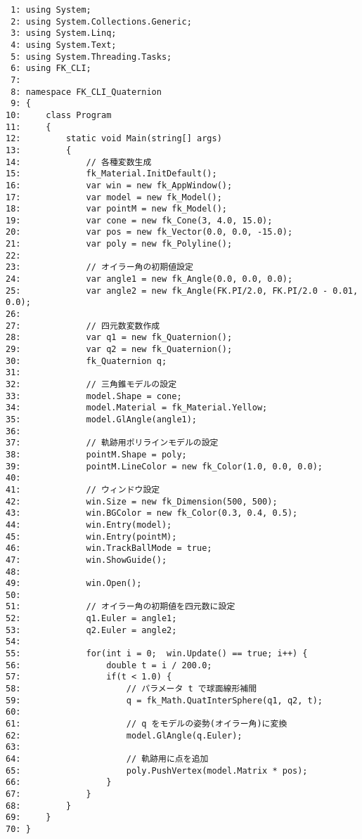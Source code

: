 \begin{breakbox}
\begin{small}
\begin{verbatim}
 1: using System;
 2: using System.Collections.Generic;
 3: using System.Linq;
 4: using System.Text;
 5: using System.Threading.Tasks;
 6: using FK_CLI;
 7: 
 8: namespace FK_CLI_Quaternion
 9: {
10:     class Program
11:     {
12:         static void Main(string[] args)
13:         {
14:             // 各種変数生成
15:             fk_Material.InitDefault();
16:             var win = new fk_AppWindow();
17:             var model = new fk_Model();
18:             var pointM = new fk_Model();
19:             var cone = new fk_Cone(3, 4.0, 15.0);
20:             var pos = new fk_Vector(0.0, 0.0, -15.0);
21:             var poly = new fk_Polyline();
22: 
23:             // オイラー角の初期値設定
24:             var angle1 = new fk_Angle(0.0, 0.0, 0.0);
25:             var angle2 = new fk_Angle(FK.PI/2.0, FK.PI/2.0 - 0.01, 0.0);
26: 
27:             // 四元数変数作成
28:             var q1 = new fk_Quaternion();
29:             var q2 = new fk_Quaternion();
30:             fk_Quaternion q;
31: 
32:             // 三角錐モデルの設定
33:             model.Shape = cone;
34:             model.Material = fk_Material.Yellow;
35:             model.GlAngle(angle1);
36: 
37:             // 軌跡用ポリラインモデルの設定
38:             pointM.Shape = poly;
39:             pointM.LineColor = new fk_Color(1.0, 0.0, 0.0);
40: 
41:             // ウィンドウ設定
42:             win.Size = new fk_Dimension(500, 500);
43:             win.BGColor = new fk_Color(0.3, 0.4, 0.5);
44:             win.Entry(model);
45:             win.Entry(pointM);
46:             win.TrackBallMode = true;
47:             win.ShowGuide();
48: 
49:             win.Open();
50: 
51:             // オイラー角の初期値を四元数に設定
52:             q1.Euler = angle1;
53:             q2.Euler = angle2;
54: 
55:             for(int i = 0;  win.Update() == true; i++) {
56:                 double t = i / 200.0;
57:                 if(t < 1.0) {
58:                     // パラメータ t で球面線形補間
59:                     q = fk_Math.QuatInterSphere(q1, q2, t);
60: 
61:                     // q をモデルの姿勢(オイラー角)に変換
62:                     model.GlAngle(q.Euler);
63: 
64:                     // 軌跡用に点を追加
65:                     poly.PushVertex(model.Matrix * pos);
66:                 }
67:             }
68:         }
69:     }
70: }
\end{verbatim}
\end{small}
\end{breakbox}
